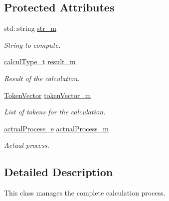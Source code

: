 \subsection*{Protected Attributes}
\begin{DoxyCompactItemize}
\item 
\hypertarget{class_analyze_a5eaf2648206b44a7136f00f6f2aea716}{}std\+::string \hyperlink{class_analyze_a5eaf2648206b44a7136f00f6f2aea716}{str\+\_\+m}\label{class_analyze_a5eaf2648206b44a7136f00f6f2aea716}

\begin{DoxyCompactList}\small\item\em String to compute. \end{DoxyCompactList}\item 
\hypertarget{class_analyze_a8fd3ae44bbbc0fc1c2f332da9fb3fb51}{}\hyperlink{mpfr_interface_8h_a16492006127cd422340be2441c22c14b}{calcul\+Type\+\_\+t} \hyperlink{class_analyze_a8fd3ae44bbbc0fc1c2f332da9fb3fb51}{result\+\_\+m}\label{class_analyze_a8fd3ae44bbbc0fc1c2f332da9fb3fb51}

\begin{DoxyCompactList}\small\item\em Result of the calculation. \end{DoxyCompactList}\item 
\hypertarget{class_analyze_a0cb9f60bf517b50df90aa9669199f61c}{}\hyperlink{token_8h_ab47f31774188c3fad94acfd21e12c917}{Token\+Vector} \hyperlink{class_analyze_a0cb9f60bf517b50df90aa9669199f61c}{token\+Vector\+\_\+m}\label{class_analyze_a0cb9f60bf517b50df90aa9669199f61c}

\begin{DoxyCompactList}\small\item\em List of tokens for the calculation. \end{DoxyCompactList}\item 
\hypertarget{class_analyze_a41743a35d696fd86ab0e4af616a6cd9a}{}\hyperlink{class_analyze_aee7ac80c3a9b19650f0d3dd3bf8712d9}{actual\+Process\+\_\+e} \hyperlink{class_analyze_a41743a35d696fd86ab0e4af616a6cd9a}{actual\+Process\+\_\+m}\label{class_analyze_a41743a35d696fd86ab0e4af616a6cd9a}

\begin{DoxyCompactList}\small\item\em Actual process. \end{DoxyCompactList}\end{DoxyCompactItemize}


\subsection{Detailed Description}
This class manages the complete calculation process. 


